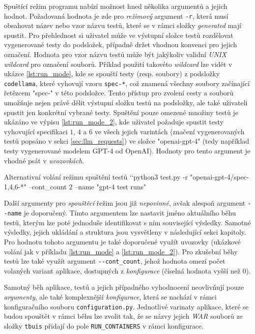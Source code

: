 \documentclass[czech, ma, kiv, he, iso690numb, pdf, viewonly]{fasthesis}
\begin{document}
    Spuštící režim programu nabízí možnost hned několika argumentů a jejich hodnot. Požadovaná hodnota je zde pro \textit{režimový} argument \verb|-r|, která musí obsahovat název nebo vzor názvu testů, které se v rámci složky \textit{generated} mají spustit. Pro přehlednost si uživatel může ve výstupní složce testů rozdělovat vygenerované testy do podsložek, případně držet vhodnou konvenci pro jejich označení. Hodnota pro vzor názvu testů může být jakýkoliv validní \textit{UNIX wildcard} pro označení souborů. Příklad použití takovéto \textit{wildcard} lze vidět v ukázce \ref{lst:run_mode}, kde se spouští testy (resp. soubory) z podsložky \verb|codellama|, které vyhovují vzoru \verb|spec-*|, což znamená všechny soubory začínající řetězcem "spec-"  v této podsložce. Tento přístup pro zvolení cesty a souborů umožňuje nejen právě dělit výstupní složku testů na podsložky, ale také uživateli spustit jen konkrétní vybrané testy. Spuštění pouze omezené množiny testů je ukázáno ve výpisu \ref{lst:run_mode_2}, kde uživatel požaduje spustit testy vyhovující specifikaci \(1\), \(4\) a \(6\) ve všech jejich varintách (značení vygenerovaných testů popsáno v sekci \ref{sec:llm_requests}) ve složce "openai-gpt-4" (tedy například testy vygenerované modelem GPT-4 od OpenAI). Hodnoty pro tento argument je vhodné psát v \emph{uvozovkách}.

    \begin{console}{Alternativní volání režimu spuštění testů \label{lst:run_mode_2}}
`\uxprompt`python3 test.py -r "openai-gpt-4/spec-{1,4,6}-*" --cont_count 2 --name "gpt-4 test runs"
    \end{console}

    Další argumenty pro \textit{spouštěcí} řežim jsou již \emph{nepovinné}, avšak alespoň argument \verb|--name| je doporučený. Tímto argumentem lze nastavit jméno aktuálního běhu testů, kterým lze poté jednoduše identifikovat s ním související výsledky. Samotné výsledky, jejich ukládání a struktura jsou vysvětleny v následující sekci kapitoly. Pro hodnotu tohoto argumentu je také doporučené využít uvozovky (ukázkové volání jak v příkladu \ref{lst:run_mode} a \ref{lst:run_mode_2}). Pro zkušební běhy testů lze také využít argument \verb|--cont_count|, jehož hodnota omezí počet volaných variant aplikace, dostupných z \textit{konfigurace} (číselná hodnota vyšší než \(0\)).

    Samotný běh aplikace, testů a jejich případného vyhodnocení neovlivňují pouze \emph{argumenty}, ale také komplexnější \emph{konfigurace}, která se nachází v rámci konfiguračního souboru \verb|configuration.py|. Jednotlivé varinaty aplikace, které se budou spouštět v rámci běhu lze zvolit tak, že se názvy jejich \textit{WAR} souborů ze složky \verb|tbuis| přidají do pole \verb|RUN_CONTAINERS| v rámci konfigurace. 
\end{document}
